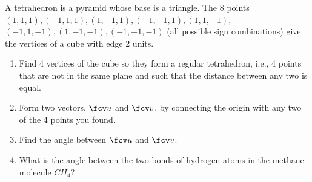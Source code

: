 A tetrahedron is a pyramid whose base is a triangle. The 8 points $(1,1,1), (-1,1,1), (1,-1,1), (-1,-1,1), (1,1,-1)$, $(-1,1,-1), (1,-1,-1), (-1,-1,-1)$ (all possible sign combinations) give the vertices of a cube with edge 2 units. 

\begin{enumerate}
\item Find 4 vertices of the cube so they form a regular tetrahedron, i.e., 4 points that are not in the same plane and such that the distance between any two is equal.
\item Form two vectors, $\fcv u$ and $\fcv v$, by connecting the origin with any two of the 4 points you found.
\item Find the angle between $\fcv u$ and $\fcv v$.
\item What is the angle between the two bonds of hydrogen atoms in the methane molecule $CH_4$?
\end{enumerate}
